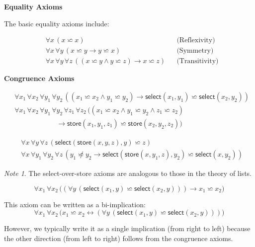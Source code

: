 \documentclass[11pt,a4paper]{article}
\theoremstyle{definition}
\theoremstyle{plain}
\theoremstyle{remark}
\newtheorem*{remark}{Note}
\begin{document}
\begin{center}
\textbf{Equality Axioms}
\end{center}

The basic equality axioms include:

\begin{align*}
&\forall x \, (x \backsimeq x) && \text{(Reflexivity)} \\
&\forall x \, \forall y \, (x \backsimeq y \rightarrow y \backsimeq x) && \text{(Symmetry)} \\
&\forall x \, \forall y \, \forall z \, ((x \backsimeq y \wedge y \backsimeq z) \rightarrow x \backsimeq z) && \text{(Transitivity)}
\end{align*}

\begin{center}
\textbf{Congruence Axioms}
\end{center}

\begin{align*}
&\forall x_1 \, \forall x_2 \, \forall y_1 \, \forall y_2 \, ((x_1 \backsimeq x_2 \wedge y_1 \backsimeq y_2) \rightarrow \textsf{select}(x_1, y_1) \backsimeq \textsf{select}(x_2, y_2)) \\
&\forall x_1 \, \forall x_2 \, \forall y_1 \, \forall y_2 \, \forall z_1 \, \forall z_2 \, ((x_1 \backsimeq x_2 \wedge y_1 \backsimeq y_2 \wedge z_1 \backsimeq z_2) \\
&\quad\quad\quad\quad\quad\quad \rightarrow \textsf{store}(x_1, y_1, z_1) \backsimeq \textsf{store}(x_2, y_2, z_2))
\end{align*}

\begin{tcolorbox}[colback=yellow!10!white,colframe=yellow!75!black,title=\textbf{Select-over-Store Axioms}]
\begin{align*}
&\forall x \, \forall y \, \forall z \, (\textsf{select}(\textsf{store}(x, y, z), y) \backsimeq z) \\
&\forall x \, \forall y_1 \, \forall y_2 \, \forall z \, (y_1 \not\backsimeq y_2 \rightarrow \textsf{select}(\textsf{store}(x, y_1, z), y_2) \backsimeq \textsf{select}(x, y_2))
\end{align*}

\begin{remark}
The select-over-store axioms are analogous to those in the theory of lists.
\end{remark}
\end{tcolorbox}

\begin{tcolorbox}[colback=teal!10!white,colframe=teal!75!black,title=\textbf{Extensionality Axiom}]
\[
\forall x_1 \, \forall x_2 \, \bigl((\forall y \, (\textsf{select}(x_1, y) \backsimeq \textsf{select}(x_2, y))) \rightarrow x_1 \backsimeq x_2\bigr)
\]

This axiom can be written as a bi-implication:
\[
\forall x_1 \, \forall x_2 \, \bigl(x_1 \backsimeq x_2 \leftrightarrow (\forall y \, (\textsf{select}(x_1, y) \backsimeq \textsf{select}(x_2, y)))\bigr)
\]

However, we typically write it as a single implication (from right to left) because the other direction (from left to right) follows from the congruence axioms.
\end{tcolorbox}
\end{document}

